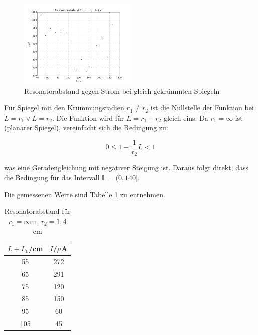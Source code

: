 \begin{figure}
	\centering
	\includegraphics[width=0.5\textwidth]{stabil1}
	\caption{Resonatorabstand gegen Strom bei gleich gekrümmten Spiegeln}
	\label{fig:stabil1}
\end{figure}

\noindent Für Spiegel mit den Krümmungsradien \(r_1\neq r_2\) ist die Nullstelle der Funktion bei \(L=r_1\lor L=r_2\). Die Funktion wird für \(L=r_1+r_2\) gleich eins. Da \(r_1=\infty\) ist (planarer Spiegel), vereinfacht sich die Bedingung zu:

\begin{equation}
0\le1-\frac{1}{r_2}L<1
\end{equation}

\noindent was eine Geradengleichung mit negativer Steigung ist. Daraus folgt direkt, dass die Bedingung für das Intervall \(\mathbb{L}=(0,140]\).

\noindent Die gemessenen Werte sind Tabelle \ref{tab:t2} zu entnehmen.

\begin{table}[H]
	\begin{center}
		\begin{tabular}{c c}
			\toprule
			\(L+L_0\)/cm & \(I\)/\(\mu\)A \\
			\midrule
			55              &272          \\                                                                           
			65              &291        \\                                                                             
			75              &120      \\                                                                               
			85              &150    \\                                                                                 
			95              &60    \\                                                                                  
			105             &45 \\
			\bottomrule
		\end{tabular}
		\caption{Resonatorabstand für \(r_1=\infty\text{m}\), \(r_2=1,4\)cm}
		\label{tab:t2}
	\end{center}
\end{table}


